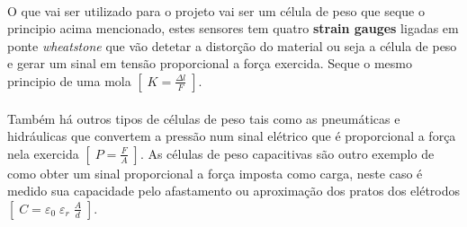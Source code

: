 \\
O que vai ser utilizado para o projeto vai ser um célula de peso que seque o principio acima mencionado, estes sensores tem quatro \textbf{strain gauges} ligadas em ponte \textit{wheatstone} que vão detetar a distorção do material ou seja a célula de peso e gerar um sinal em tensão proporcional a força exercida. Seque o mesmo principio de uma mola $ [ \; K = \frac{\Delta l}{F} \; ] $.
\\
\\
Também há outros tipos de células de peso tais como as pneumáticas e hidráulicas que convertem a pressão num sinal elétrico que é proporcional a força nela exercida $ [ \; P = \frac{F}{A} \; ] $. As células de peso capacitivas são outro exemplo de como obter um sinal proporcional a força imposta como carga, neste caso é medido sua capacidade pelo afastamento ou aproximação dos pratos dos elétrodos $ [ \; C = \varepsilon_{0} \; \varepsilon_{r} \; \frac{A}{d} \; ] $.

